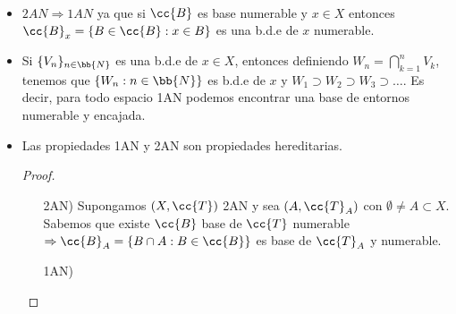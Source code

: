 \begin{observacion}\
    \begin{itemize}
        \item $2AN \Rightarrow 1AN$ ya que si $\cc{B}$ es base numerable y $x\in X$ entonces $\cc{B}_x=\{B\in \cc{B} : x\in B\}$ es una b.d.e de $x$ numerable.
        \item Si $\{V_n\}_{n\in \bb{N}}$ es una b.d.e de $x\in X$, entonces definiendo $W_n=\bigcap\limits_{k=1}^n V_k$, tenemos que $\{W_n : n\in \bb{N}\}$ es b.d.e de $x$ y $W_1 \supset W_2 \supset W_3 \supset \dots$. Es decir, para todo espacio 1AN podemos encontrar una base de entornos numerable y encajada.
        \item Las propiedades 1AN y 2AN son propiedades hereditarias.
        \begin{proof}\
            \begin{itemize}
                \item[2AN)] Supongamos $(X, \cc{T})$ 2AN y sea $(A, \cc{T}_A)$ con $\emptyset \neq A \subset X$. Sabemos que existe $\cc{B}$ base de $\cc{T}$ numerable $\Rightarrow \cc{B}_A = \{B\cap A : B \in \cc{B}\}$ es base de $\cc{T}_A$ y numerable.
                \item[1AN)] %
            \end{itemize}
        \end{proof}
    \end{itemize}
\end{observacion}

